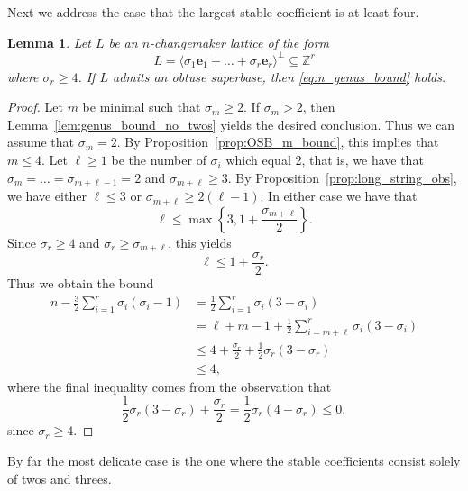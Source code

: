\documentclass{amsart} %
\newcommand{\Z}{\mathbb{Z}}
\newcommand{\e}{\bm{e}}
\theoremstyle{thm}
\newtheorem{lem}[Theorem]{Lemma}
\theoremstyle{definition}
\numberwithin{equation}{section}
\begin{document}
Next we address the case that the largest stable coefficient is at least four.
\begin{lem}\label{lem:genus_bound_large_coef}
Let $L$ be an $n$-changemaker lattice of the form
\[
L=\langle \sigma_1 \e_1+ \dots+ \sigma_r \e_r\rangle^\bot\subseteq \Z^r
\]
where $\sigma_r\geq 4$. If $L$ admits an obtuse superbase, then \eqref{eq:n_genus_bound} holds.
\end{lem}
\begin{proof}
    Let $m$ be minimal such that $\sigma_m\geq 2$. If $\sigma_m>2$, then Lemma~\ref{lem:genus_bound_no_twos} yields the desired conclusion. Thus we can assume that $\sigma_m=2$. By Proposition~\ref{prop:OSB_m_bound}, this implies that $m\leq 4$. Let $\ell\geq 1$ be the number of $\sigma_i$ which equal 2, that is, we have that $\sigma_m=\dots = \sigma_{m+\ell-1}=2$ and $\sigma_{m+\ell}\geq 3$.
     By Proposition~\ref{prop:long_string_obs}, we have either $\ell \leq 3$ or $\sigma_{m+\ell}\geq 2(\ell-1)$. In either case we have that
     \[\ell \leq \max\left\{3, 1+\frac{\sigma_{m+\ell}}{2}\right\}.\]
Since $\sigma_r\geq 4$ and $\sigma_r\geq \sigma_{m+\ell}$, this yields 
\[\ell\leq 1+ \frac{\sigma_r}{2}.\]
Thus we obtain the bound
    \begin{align*}
n - \frac32\sum_{i=1}^r   \sigma_i(\sigma_i-1) &= \frac12\sum_{i=1}^r \sigma_i(3-\sigma_i)\\
& = \ell + m-1 +\frac12\sum_{i=m+\ell}^r \sigma_i(3-\sigma_i)\\
&\leq 4+\frac{\sigma_r}{2}+ \frac12 \sigma_r(3-\sigma_r)\\
&\leq 4,
\end{align*}
where the final inequality comes from the observation that
\[\frac12 \sigma_r(3-\sigma_r) +\frac{\sigma_r}{2}=\frac{1}{2}\sigma_r(4-\sigma_r)\leq 0,\] since $\sigma_r\geq 4$. 
\end{proof}
By far the most delicate case is the one where the stable coefficients consist solely of twos and threes. 
\end{document}
